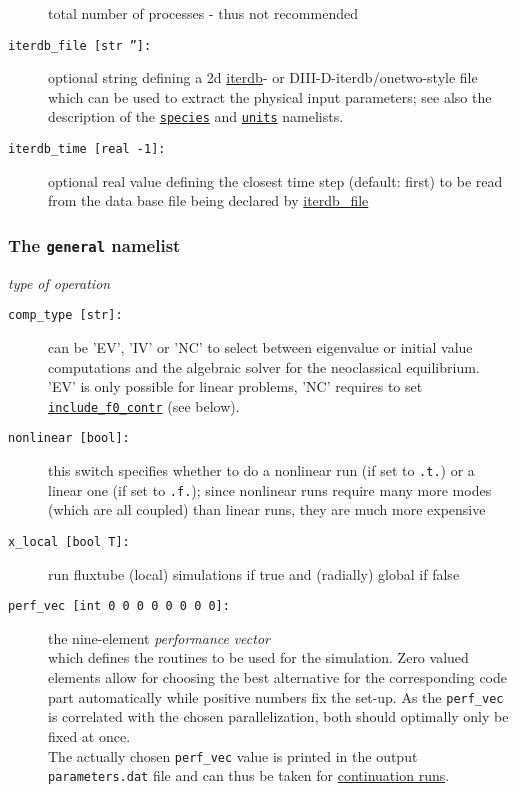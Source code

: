 \documentclass[12pt]{article}
\begin{document}
\begin{description}
{total number of processes - thus not recommended}
\item[\hypertarget{iterdb_file}{\tt iterdb\_file [str '']:}] optional string defining a 2d
\href{http://tokamak-profiledb.ccfe.ac.uk/}{iterdb}- or DIII-D-iterdb/onetwo-style file
which can be used to extract the physical input parameters;
see also the description of the \hyperlink{species_nml}{\tt species} and
\hyperlink{units_nml}{\tt units} namelists.
\item[\texttt{iterdb\_time [real -1]:}] optional real value defining the closest time step (default: first)
to be read from the data base file being declared by \hyperlink{iterdb_file}{iterdb\_file}
\end{description}

\subsubsection{The \texttt{general} namelist}
%
{\em type of operation}
\begin{description}
\item[\hypertarget{comp_type}{\texttt{comp\_type [str]:}}] can be 'EV', 'IV' or 'NC' to select between eigenvalue or initial value
computations and the algebraic solver for the neoclassical equilibrium. 'EV' is only possible for linear problems, 'NC' requires to set
\hyperlink{include_f0_contr}{\tt include\_f0\_contr} (see below).
\item[\texttt{nonlinear [bool]:}] this switch specifies whether to do a nonlinear run (if set to
\texttt{.t.}) or a linear one (if set to \texttt{.f.}); since nonlinear runs require many more
modes (which are all coupled) than linear runs, they are much more expensive
\item[\hypertarget{x_local}{\texttt{x\_local [bool T]:}}] run fluxtube (local) simulations if true and (radially) global if false
\item[\hypertarget{perf_vec}{\tt perf\_vec [int 0 0 0 0 0 0 0 0]:}] the nine-element
{\em performance} {\em vector}\\ which defines the routines to be used for the simulation.
Zero valued elements allow for choosing the best alternative for the corresponding code part
automatically while positive numbers fix the set-up. As the {\tt perf\_vec} is correlated
with the chosen parallelization, both should optimally only be fixed at once.\\
The actually chosen {\tt perf\_vec} value is printed in the output {\tt para\-me\-ters.dat} file and
can thus be taken for \hyperref[subsubsec:continue_sim]{continuation runs}.
\end{description}
\end{document}
